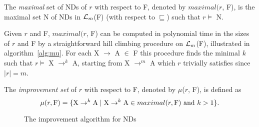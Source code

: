 \medskip

\begin{definition}
\begin{rm}
The {\em maximal} set of NDs of $r$ with respect to F,
denoted by $maximal(r$, F), is the maximal set N of NDs
in ${\cal L}_m$(F) (with respect to $\sqsubseteq$) such that $r \models$ N.
\end{rm}
\end{definition}
\medskip

Given $r$ and F, $maximal(r$, F) can be computed in polynomial time in the
sizes of $r$ and F by a straightforward hill climbing procedure
on ${\cal L}_m$(F), illustrated in algorithm~\ref{alg:mu}. For each X $\to$ A $\in$ F this procedure finds 
the minimal $k$ such that $r \models$ X $\to^k$ A, starting 
from X $\to^m$ A which $r$ trivially satisfies since $\mid r \mid = m$. 


\begin{definition}
\begin{rm}
The {\em improvement set} of $r$ with respect to F, 
denoted by $\mu$($r$, F), is defined as 
\begin{displaymath}
\mu(r, {\rm F}) = \{{\rm X} \to^k {\rm A} \mid 
{\rm X} \to^k {\rm A} \in maximal(r, {\rm F}) \mbox{ and }  k > 1\}.
\end{displaymath}
\end{rm}
\end{definition}
\medskip


{\renewcommand{\baselinestretch}{1}
\begin{figure}[ht]
\begin{center}
\end{center}
\caption{\label{numdep:fig:mu} The improvement algorithm for NDs}
\end{figure}
}


